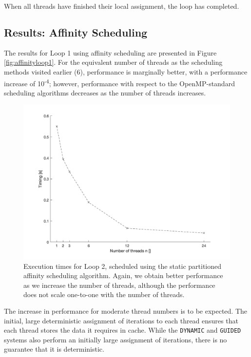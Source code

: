 \documentclass{article} %
\newcommand{\tp}{\texttt}
\begin{document}
When all threads have finished their local assignment, the loop has completed.

\subsection*{Results: Affinity Scheduling}

The results for Loop 1 using affinity scheduling are presented in Figure \ref{fig:affinityloop1}. 
For the equivalent number of threads as the scheduling methods visited earlier (6), performance is marginally better, with a performance increase of 10\textsuperscript{-4}; however, performance with respect to the OpenMP-standard scheduling algorithms decreases as the number of threads increases.

\begin{figure}
    \centering
    \includegraphics[height=.35\textheight]{part2_plots/affinity_loop2}
    \caption{Execution times for Loop 2, scheduled using the static partitioned affinity scheduling algorithm. Again, we obtain better performance as we increase the number of threads, although the performance does not scale one-to-one with the number of threads.}
    \label{fig:affinityloop2}
\end{figure}

The increase in performance for moderate thread numbers is to be expected.
The initial, large deterministic assignment of iterations to each thread ensures that each thread stores the data it requires in cache.
While the \tp{DYNAMIC} and \tp{GUIDED} systems also perform an initially large assignment of iterations, there is no guarantee that it is deterministic.
\end{document}
